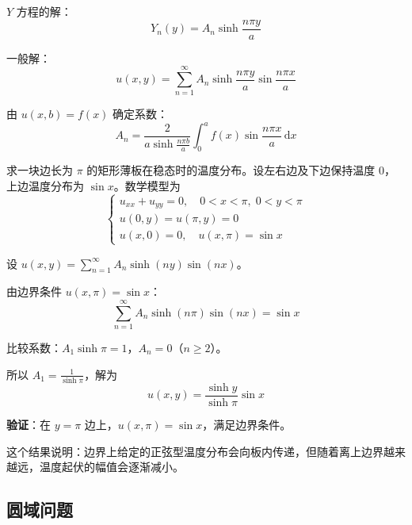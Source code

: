 $Y$ 方程的解：
\begin{equation}
    Y_n(y) = A_n\sinh\frac{n\pi y}{a}
\end{equation}

一般解：
\begin{equation}
    u(x, y) = \sum_{n=1}^{\infty} A_n\sinh\frac{n\pi y}{a}\sin\frac{n\pi x}{a}
\end{equation}

由 $u(x, b) = f(x)$ 确定系数：
\begin{equation}
    A_n = \frac{2}{a\sinh\frac{n\pi b}{a}}\int_0^a f(x)\sin\frac{n\pi x}{a}\,\mathrm{d}x
\end{equation}

\begin{lizi}{}{}
求一块边长为 $\pi$ 的矩形薄板在稳态时的温度分布。设左右边及下边保持温度 $0$，上边温度分布为 $\sin x$。数学模型为
\begin{equation}
    \begin{cases}
        u_{xx} + u_{yy} = 0, \quad 0 < x < \pi, \; 0 < y < \pi \\
        u(0, y) = u(\pi, y) = 0 \\
        u(x, 0) = 0, \quad u(x, \pi) = \sin x
    \end{cases}
\end{equation}

\begin{jie}
    设 $u(x, y) = \sum_{n=1}^{\infty} A_n\sinh(ny)\sin(nx)$。

    由边界条件 $u(x, \pi) = \sin x$：
    \begin{equation}
        \sum_{n=1}^{\infty} A_n\sinh(n\pi)\sin(nx) = \sin x
    \end{equation}

    比较系数：$A_1\sinh\pi = 1$，$A_n = 0$（$n \geq 2$）。

    所以 $A_1 = \frac{1}{\sinh\pi}$，解为
    \begin{equation}
        u(x, y) = \frac{\sinh y}{\sinh\pi}\sin x
    \end{equation}

    \textbf{验证}：在 $y = \pi$ 边上，$u(x, \pi) = \sin x$，满足边界条件。

    这个结果说明：边界上给定的正弦型温度分布会向板内传递，但随着离上边界越来越远，温度起伏的幅值会逐渐减小。
\end{jie}
\end{lizi}

\subsection{圆域问题}

